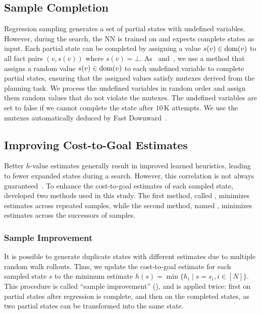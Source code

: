 \documentclass[ppgc,diss,english]{iiufrgs}
\begin{document}
\subsection{Sample Completion}
\label{sec:sample-completion}
Regression sampling generates a set of partial states with undefined variables. However, during the search, the NN is trained on and expects complete states as input.
Each partial state can be completed by assigning a value $s(v)\in\operatorname{dom}(v)$ to all fact pairs $(v,s(v))$ where $s(v)=\bot$.
As~\citet{Bettker.etal/2022} and~\citet{Ferber.etal/2022}, we use a method that assigns a random value $s(v) \in \operatorname{dom}(v)$ to each undefined variable to complete partial states, ensuring that the assigned values satisfy mutexes derived from the planning task. We process the undefined variables in random order and assign them random values that do not violate the mutexes. The undefined variables are set to false if we cannot complete the state after $10$\,K attempts. We use the mutexes automatically deduced by Fast Downward~\cite{Helmert/2006,Helmert/2009}.

\subsection{Improving Cost-to-Goal Estimates}
\label{sec:sample-improving-h}
Better $h$-value estimates generally result in improved learned heuristics, leading to fewer expanded states during a search. However, this correlation is not always guaranteed~\cite{Holte/2010}. To enhance the cost-to-goal estimates of each sampled state,~\citet{Bettker.etal/2022} developed two methods used in this study. The first method, called \sai, minimizes estimates across repeated samples, while the second method, named \sui, minimizes estimates across the successors of samples.


\subsubsection{Sample Improvement}
\label{sec:sample-sai}
It is possible to generate duplicate states with different estimates due to multiple random walk rollouts. Thus, we update the cost-to-goal estimate for each sampled state $s$ to the minimum estimate $h(s) = \min\{h_i \mid s=s_i, i\in[N]\}$.
This procedure is called ``sample improvement'' (\sai), and is applied twice: first on partial states after regression is complete, and then on the completed states, as two partial states can be transformed into the same state.
\end{document}
